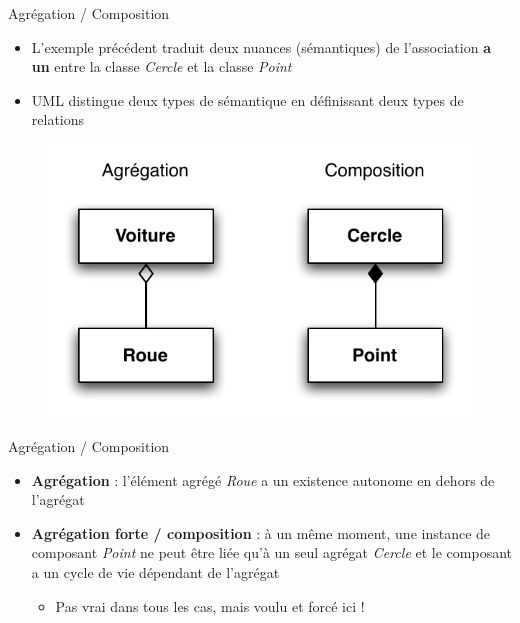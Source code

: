 \begin{frame}{Agrégation / Composition}
\begin{itemize}
	\item L'exemple précédent traduit deux nuances (sémantiques) de l'association \textbf{a un} entre la classe \emph{Cercle} et la classe \emph{Point}
	\item UML distingue deux types de sémantique en définissant deux types de relations
\end{itemize}
\begin{figure}[htbp]
    \begin{center}
      \includegraphics[scale=.45]{fig/agregcompo.pdf}
    \end{center}
  \end{figure}
\end{frame}

\begin{frame}{Agrégation / Composition}
\begin{itemize}
	\item \textbf{Agrégation} : l'élément agrégé \emph{Roue} a un existence autonome en dehors de l'agrégat
	\item \textbf{Agrégation forte / composition} : à un même moment, une instance de composant \emph{Point} ne peut être liée qu'à un seul agrégat \emph{Cercle} et le composant a un cycle de vie dépendant de l'agrégat
	\begin{itemize}
	\item Pas vrai dans tous les cas, mais voulu et forcé ici !
	\end{itemize}
\end{itemize}
\end{frame}

